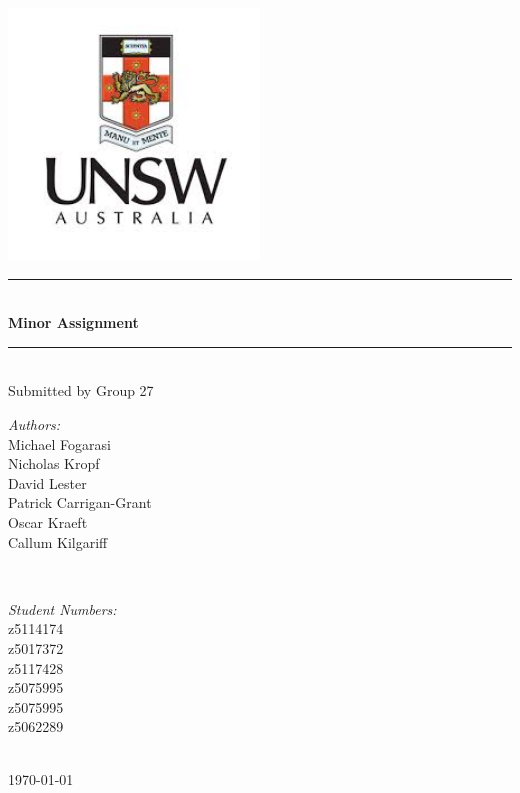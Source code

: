 \documentclass[12pt]{article}
\begin{document}
\begin{titlepage}

\newcommand{\HRule}{\rule{\linewidth}{0.5mm}} 
\newcommand\tab[1][1cm]{\hspace*{#1}}

\center

\includegraphics[width=0.5\textwidth]{unilogo.png}\\[1cm] 



\HRule \\[0.4cm]
{ \huge \bfseries Minor Assignment}\\[0.4cm] 
\HRule \\[0.5cm]
Submitted by Group 27 \\
\vspace{0.5cm}

 
\begin{minipage}{0.4\textwidth}
\begin{flushleft} \large
\emph{Authors:}\\
Michael Fogarasi \\ 
Nicholas Kropf \\
David Lester \\
Patrick Carrigan-Grant\\
Oscar Kraeft\\
Callum Kilgariff
\end{flushleft}
\end{minipage}
~
\begin{minipage}{0.4\textwidth}
\begin{flushright} \large
\emph{Student Numbers:} \\
z5114174 \\
z5017372 \\ 
z5117428 \\
z5075995 \\
z5075995 \\
z5062289 \\
\end{flushright}
\end{minipage}\\ [0.5cm]


{\small \today}\\[1cm] 


\vfill 

\end{titlepage}
\end{document}
